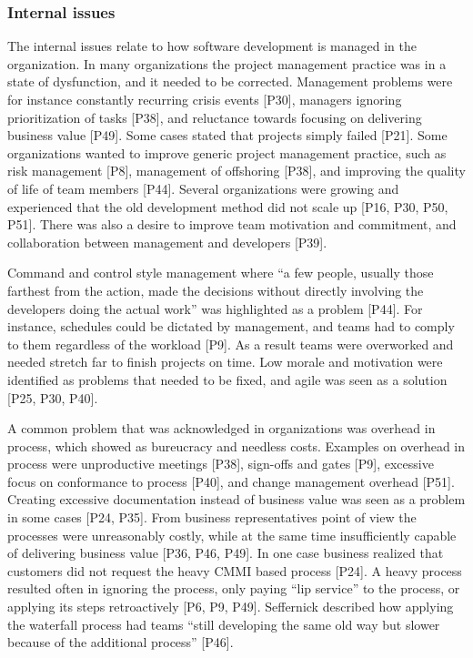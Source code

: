 \documentclass[preprint,authoryear,12pt]{elsarticle}
\begin{document}
\subsubsection{Internal issues}

The internal issues relate to how software development is managed in the
organization. In many organizations the project management practice was in a
state of dysfunction, and it needed to be corrected. Management problems were
for instance constantly recurring crisis events [P30], managers ignoring
prioritization of tasks [P38], and reluctance towards focusing on delivering
business value [P49]. Some cases stated that projects simply failed [P21]. Some
organizations wanted to improve generic project management practice, such as
risk management [P8], management of offshoring [P38], and improving the quality
of life of team members [P44]. Several organizations were growing and
experienced that the old development method did not scale up [P16, P30, P50, P51].
There was also a desire to improve team motivation and commitment, and
collaboration between management and developers [P39].

Command and control style management where ``a few people, usually those
farthest from the action, made the decisions without directly involving the
developers doing the actual work'' was highlighted as a problem [P44]. For
instance, schedules could be dictated by management, and teams had to comply to
them regardless of the workload [P9]. As a result teams were overworked and
needed stretch far to finish projects on time. Low morale and motivation were
identified as problems that needed to be fixed, and agile was seen as a solution
[P25, P30, P40].

A common problem that was acknowledged in organizations was overhead in process,
which showed as bureucracy and needless costs. Examples on overhead in process
were unproductive meetings [P38], sign-offs and gates [P9], excessive focus on
conformance to process [P40], and change management overhead [P51]. Creating
excessive documentation instead of business value was seen as a problem in some
cases [P24, P35].
From business representatives point of view the processes were unreasonably
costly, while at the same time insufficiently capable of delivering business
value [P36, P46, P49]. In one case business realized that customers did not
request the heavy CMMI based process [P24].
A heavy process resulted often in ignoring the process, only paying ``lip
service'' to the process, or applying its steps retroactively [P6, P9, P49].
Seffernick described how applying the waterfall process had teams ``still
developing the same old way but slower because of the additional process''
[P46].
\end{document}
